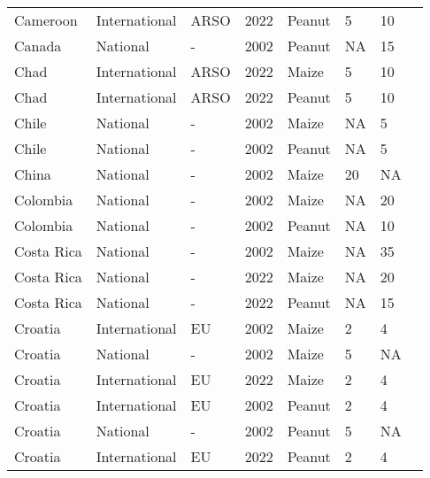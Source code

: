\begin{landscape}
\begin{longtable}[c]{llllllll}
Cameroon          & International & ARSO     & 2022 & Peanut & 5  & 10 & \citet{ARSO2022}             \\
Canada            & National      & -        & 2002 & Peanut & NA & 15 & \citet{van2004worldwide}     \\
Chad              & International & ARSO     & 2022 & Maize  & 5  & 10 & \citet{ARSO2022}             \\
Chad              & International & ARSO     & 2022 & Peanut & 5  & 10 & \citet{ARSO2022}             \\
Chile             & National      & -        & 2002 & Maize  & NA & 5  & \citet{van2004worldwide}     \\
Chile             & National      & -        & 2002 & Peanut & NA & 5  & \citet{van2004worldwide}     \\
China             & National      & -        & 2002 & Maize  & 20 & NA & \citet{van2004worldwide}     \\
Colombia          & National      & -        & 2002 & Maize  & NA & 20 & \citet{van2004worldwide}     \\
Colombia          & National      & -        & 2002 & Peanut & NA & 10 & \citet{van2004worldwide}     \\
Costa Rica        & National      & -        & 2002 & Maize  & NA & 35 & \citet{van2004worldwide}     \\
Costa Rica        & National      & -        & 2022 & Maize  & NA & 20 & \citet{MHCR2011a}            \\
Costa Rica        & National      & -        & 2022 & Peanut & NA & 15 & \citet{MHCR2011b}            \\
Croatia           & International & EU       & 2002 & Maize  & 2  & 4  & \citet{EC2010}               \\
Croatia           & National      & -        & 2002 & Maize  & 5  & NA & \citet{van2004worldwide}     \\
Croatia           & International & EU       & 2022 & Maize  & 2  & 4  & \citet{EC2010}               \\
Croatia           & International & EU       & 2002 & Peanut & 2  & 4  & \citet{EC2010}               \\
Croatia           & National      & -        & 2002 & Peanut & 5  & NA & \citet{van2004worldwide}     \\
Croatia           & International & EU       & 2022 & Peanut & 2  & 4  & \citet{EC2010}               \\

\end{longtable}
\end{landscape}
